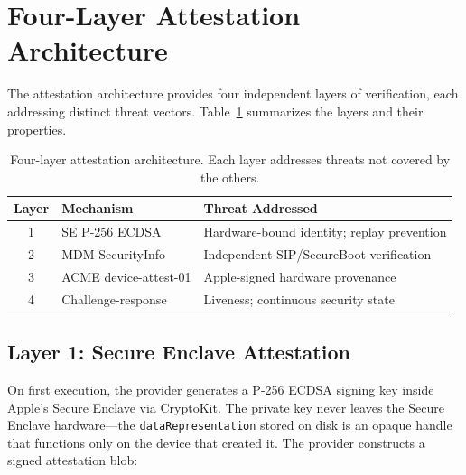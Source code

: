 \documentclass[10pt,twocolumn,letterpaper]{article}
\begin{document}
\section{Four-Layer Attestation Architecture}
\label{sec:attestation}

The attestation architecture provides four independent layers of verification, each addressing distinct threat vectors. Table~\ref{tab:trust-layers} summarizes the layers and their properties.

\begin{table}[h]
\centering
\caption{Four-layer attestation architecture. Each layer addresses threats not covered by the others.}
\label{tab:trust-layers}
\vspace{4pt}
\scriptsize
\begin{tabular}{@{}clp{2.8cm}@{}}
\toprule
\textbf{Layer} & \textbf{Mechanism} & \textbf{Threat Addressed} \\
\midrule
1 & SE P-256 ECDSA & Hardware-bound identity; replay prevention \\
2 & MDM SecurityInfo & Independent SIP/SecureBoot verification \\
3 & ACME device-attest-01 & Apple-signed hardware provenance \\
4 & Challenge-response & Liveness; continuous security state \\
\bottomrule
\end{tabular}
\end{table}

\subsection{Layer 1: Secure Enclave Attestation}
\label{sec:se-attest}

On first execution, the provider generates a P-256 ECDSA signing key inside Apple's Secure Enclave via CryptoKit. The private key never leaves the Secure Enclave hardware---the \texttt{dataRepresentation} stored on disk is an opaque handle that functions only on the device that created it. The provider constructs a signed attestation blob:
\end{document}
